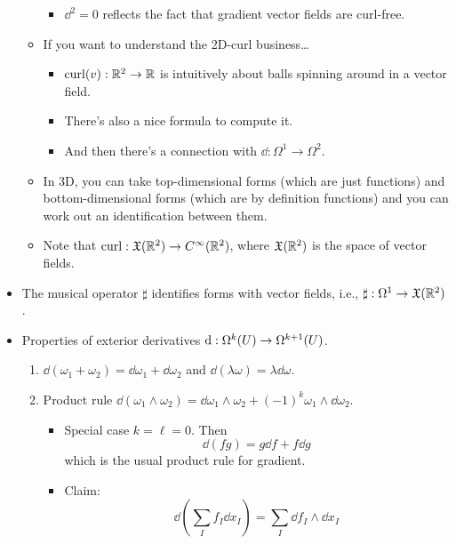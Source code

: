 \documentclass[../notes.tex]{subfiles}
\begin{document}
\begin{itemize}
\begin{itemize}
        \begin{itemize}
            \item $\dd^2=0$ reflects the fact that gradient vector fields are curl-free.
        \end{itemize}
        \item If you want to understand the 2D-curl business\dots
        \begin{itemize}
            \item $\crl(v):\R^2\to\R$ is intuitively about balls spinning around in a vector field.
            \item There's also a nice formula to compute it.
            \item And then there's a connection with $\dd:\Omega^1\to\Omega^2$.
        \end{itemize}
        \item In 3D, you can take top-dimensional forms (which are just functions) and bottom-dimensional forms (which are by definition functions) and you can work out an identification between them.
        \item Note that $\crl:\mathfrak{X}(\R^2)\to C^\infty(\R^2)$, where $\mathfrak{X}(\R^2)$ is the space of vector fields.
    \end{itemize}
    \item The musical operator $\sharp$ identifies forms with vector fields, i.e., $\sharp:\Omega^1\to\mathfrak{X}(\R^2)$.
    \item Properties of exterior derivatives $\dd:\ome[k]{U}\to\ome[k+1]{U}$.
    \begin{enumerate}
        \item $\dd{(\omega_1+\omega_2)}=\dd{\omega_1}+\dd{\omega_2}$ and $\dd{(\lambda\omega)}=\lambda\dd{\omega}$.
        \item Product rule $\dd{(\omega_1\wedge\omega_2)}=\dd{\omega_1}\wedge\omega_2+(-1)^k\omega_1\wedge\dd{\omega_2}$.
        \begin{itemize}
            \item Special case $k=\ell=0$. Then
            \begin{equation*}
                \dd{(fg)} = g\dd{f}+f\dd{g}
            \end{equation*}
            which is the usual product rule for gradient.
            \item Claim:
            \begin{equation*}
                \dd{\left( \sum_If_I\dd{x_I} \right)} = \sum_I\dd{f_I}\wedge\dd{x_I}
            \end{equation*}

\end{itemize}
\end{enumerate}
\end{itemize}
\end{document}

